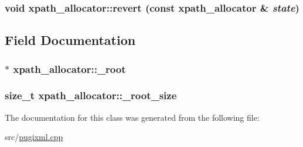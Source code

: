 \label{classxpath__allocator_a9436b8bdef3e0e0ff0df28c2af6a430d}
\hypertarget{classxpath__allocator_af1c3ec117935d4488bbd16adf807fbc1}{
\subsubsection[{revert}]{\setlength{\rightskip}{0pt plus 5cm}void xpath\_\-allocator::revert (const {\bf xpath\_\-allocator} \& {\em state})}}
\label{classxpath__allocator_af1c3ec117935d4488bbd16adf807fbc1}


\subsection{Field Documentation}
\hypertarget{classxpath__allocator_ace647e1e57dd658b4bbcd3b18fb567f1}{
\subsubsection[{\_\-root}]{$\ast$ {\bf xpath\_\-allocator::\_\-root}}}
\label{classxpath__allocator_ace647e1e57dd658b4bbcd3b18fb567f1}
\hypertarget{classxpath__allocator_adc703a6c3f3a0435f8b5f2e6c770b3fe}{
\subsubsection[{\_\-root\_\-size}]{\setlength{\rightskip}{0pt plus 5cm}size\_\-t {\bf xpath\_\-allocator::\_\-root\_\-size}}}
\label{classxpath__allocator_adc703a6c3f3a0435f8b5f2e6c770b3fe}


The documentation for this class was generated from the following file:\begin{DoxyCompactItemize}
\item 
src/\hyperlink{pugixml_8cpp}{pugixml.cpp}\end{DoxyCompactItemize}

